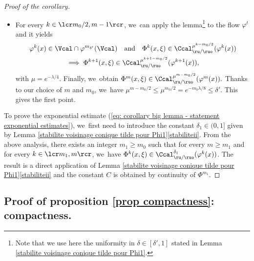 \begin{proof}[Proof of the corollary]
\begin{itemize}
\[\]
then we get $\delta_{m_0/2} = 1$,
\[
\Phi^{m_0/2} (x,\xi) \notin \overline{\Ccal_{\rso/\rs}^{1} (\varphi^{m_0/2} (x))} \quad\text{and thus } \Phi^{m_0/2} (x,\xi) \in \Ccal_{\ru/\ruo}^{1} (\varphi^{m_0/2} (x)).
\]
\item For every $k\in\lcr m_0/2,m-1\rcr$, we~can apply the lemma\footnote{Note that we use here the uniformity in $\delta \in [\delta', 1]$ stated in Lemma \ref{stabilite voisinage conique tilde pour Phi1}.} to the flow $\varphi^t$ and it yields
\begin{multline*}
\varphi^k (x) \in \Vcal \cap \varphi^{m_{\delta'}} (\Vcal) \quad \text{and} \quad \Phi^k (x,\xi) \in \Ccal_{\ru/\ruo}^{\mu^{k-m_0/2}} (\varphi^k (x)) \\
\implies \Phi^{k+1}(x,\xi) \in \Ccal_{\ru/\ruo}^{\mu^{k+1-m_0/2}} (\varphi^{k+1} (x)),
\end{multline*}
with $\mu = e^{-\lambda/4}$. Finally, we~obtain
$ \Phi^{m}(x,\xi) \in \Ccal_{\ru/\ruo}^{\mu^{m - m_0/2}} (\varphi^{m} (x)).$ Thanks to our choice of $m$ and $m_0$, we~have $\mu^{m - m_0/2} \leq \mu^{m_0/2} = e^{-m_0 \lambda /8} \leq \delta'$. This gives the first point.
\end{itemize}

To prove the exponential estimate (\ref{eq: corollary big lemma - statement exponential estimates}), we~first need to introduce the constant $\delta_1\in(0,1]$ given by  Lemma \ref{stabilite voisinage conique tilde pour Phi1}\eqref{stabiliteii}. From the above analysis, there exists an integer $m_1 \geq m_0$ such that for every $m \geq m_1$ and for every $k\in\lcr m_1,m\rcr$, we~have $ \Phi^k (x,\xi) \in \Ccal_{\ru/\ruo}^{\delta_1} (\varphi^k (x))$. The result is a direct application of Lemma \ref{stabilite voisinage conique tilde pour Phi1}\eqref{stabiliteii} and the constant $C$ is obtained by continuity of $\Phi^{m_1}$.
\end{proof}

\subsection{Proof of proposition \ref{prop compactness}: compactness.}
\label{subsection: proof compactness result}

